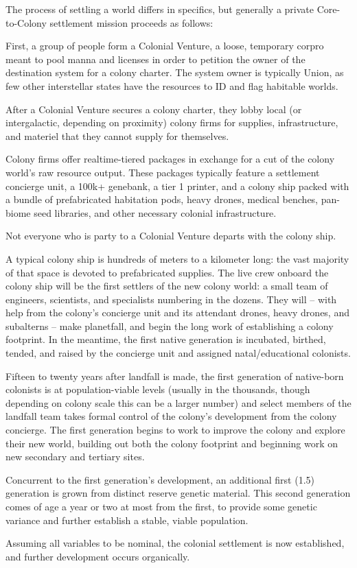 The process of settling a world differs in specifics, but generally a private Core-to-Colony  
settlement mission proceeds as follows:
 

First, a group of people form a Colonial Venture, a loose, temporary corpro meant to pool manna  
and licenses in order to petition the owner of the destination system for a colony charter. The  
system owner is typically Union, as few other interstellar states have the resources to ID and flag  
habitable worlds.  
 

After a Colonial Venture secures a colony charter, they lobby local (or intergalactic, depending on  
proximity) colony firms for supplies, infrastructure, and materiel that they cannot supply for  
themselves. 
 

Colony firms offer realtime-tiered packages in exchange for a cut of the colony world’s raw  
resource output. These packages typically feature a settlement concierge unit, a 100k+  
genebank, a tier 1 printer, and a colony ship packed with a bundle of prefabricated habitation  
pods, heavy drones, medical benches, pan-biome seed libraries, and other necessary colonial  
infrastructure. 
 

Not everyone who is party to a Colonial Venture departs with the colony ship. 
 

A typical colony ship is hundreds of meters to a kilometer long: the vast majority of that space is  
devoted to prefabricated supplies. The live crew onboard the colony ship will be the first settlers  
of the new colony world: a small team of engineers, scientists, and specialists numbering in the  
dozens. They will -- with help from the colony’s concierge unit and its attendant drones, heavy  
drones, and subalterns -- make planetfall, and begin the long work of establishing a colony  
footprint. In the meantime, the first native generation is incubated, birthed, tended, and raised by  
the concierge unit and assigned natal/educational colonists. 
 

Fifteen to twenty years after landfall is made, the first generation of native-born colonists is at  
population-viable levels (usually in the thousands, though depending on colony scale this can be  
a larger number) and select members of the landfall team takes formal control of the colony’s  
development from the colony concierge. The first generation begins to work to improve the  
colony and explore their new world, building out both the colony footprint and beginning work on  
new secondary and tertiary sites. 
 

Concurrent to the first generation’s development, an additional first (1.5) generation is grown  
from distinct reserve genetic material. This second generation comes of age a year or two at  
most from the first, to provide some genetic variance and further establish a stable, viable  
population. 
 

                                                                                                            


Assuming all variables to be nominal, the colonial settlement is now established, and further  
development occurs organically.  
 